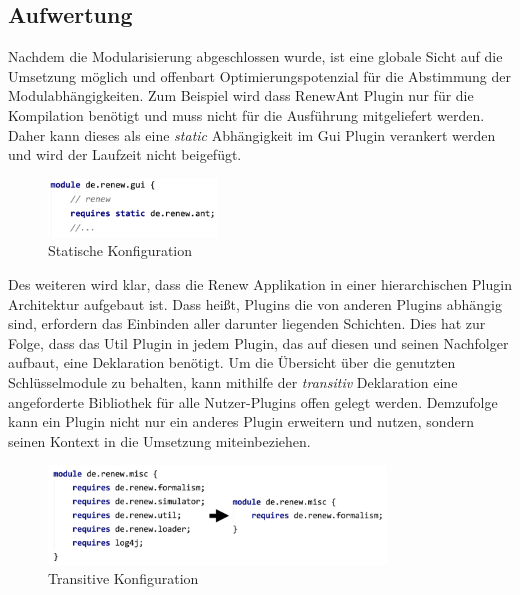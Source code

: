 \subsection{Aufwertung} \label{sub:optimierung}
	Nachdem die Modularisierung abgeschlossen wurde, ist eine globale Sicht auf die Umsetzung möglich und offenbart Optimierungspotenzial für die Abstimmung der Modulabhängigkeiten. Zum Beispiel wird dass RenewAnt Plugin nur für die Kompilation benötigt und muss nicht für die Ausführung mitgeliefert werden. Daher kann dieses als eine \textit{static} Abhängigkeit im Gui Plugin verankert werden und wird der Laufzeit nicht beigefügt.
	\bigbreak
	\begin{figure}[h!]
	  \centering
	  \includegraphics[width=0.4\textwidth]{material/images/gui_config.png}
	  \caption{Statische Konfiguration}
	  \label{fig:remote_config}
	\end{figure}
	Des weiteren wird klar, dass die Renew Applikation in einer hierarchischen Plugin Architektur aufgebaut ist. Dass heißt, Plugins die von anderen Plugins abhängig sind, erfordern das Einbinden aller darunter liegenden Schichten. Dies hat zur Folge, dass das Util Plugin in jedem Plugin, das auf diesen und seinen Nachfolger aufbaut, eine Deklaration benötigt. Um die Übersicht über die genutzten Schlüsselmodule zu behalten, kann mithilfe der \textit{transitiv} Deklaration eine angeforderte Bibliothek für alle Nutzer-Plugins offen gelegt werden. Demzufolge kann ein Plugin nicht nur ein anderes Plugin erweitern und nutzen, sondern seinen Kontext in die Umsetzung miteinbeziehen. 
	\bigbreak
	\begin{figure}[h!]
	  \centering
	  \includegraphics[width=0.8\textwidth]{material/images/misc_trans.png}
	  \caption{Transitive Konfiguration}
	  \label{fig:trans_config}
	\end{figure}


